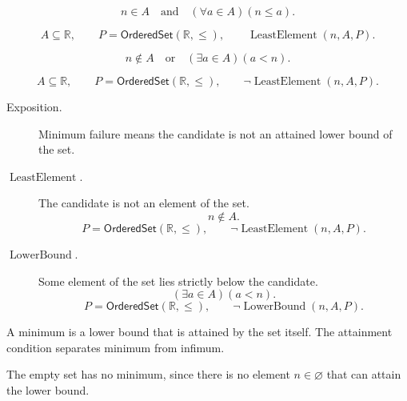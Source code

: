 \begin{remark*}
\[
  n\in A
  \quad\text{and}\quad
  (\forall a\in A)(n\leq a).
\]
\end{remark*}

\begin{remark*}
\[
  A\subseteq\mathbb{R},\qquad P=\mathsf{OrderedSet}(\mathbb{R},\leq),\qquad
  \operatorname{LeastElement}(n,A,P).
\]
\end{remark*}

\begin{remark*}
\[
  n\notin A
  \quad\text{or}\quad
  (\exists a\in A)(a<n).
\]
\end{remark*}

\begin{remark*}
\[
  A\subseteq\mathbb{R},\qquad P=\mathsf{OrderedSet}(\mathbb{R},\leq),\qquad
  \neg\operatorname{LeastElement}(n,A,P).
\]
\end{remark*}

\begin{remark*}
\begin{description}
  \item[Exposition.]
  Minimum failure means the candidate is not an attained lower bound of
  the set.

  \item[\(\operatorname{LeastElement}.\)]
  The candidate is not an element of the set.
  \[
    n\notin A.
  \]
  \[
    P=\mathsf{OrderedSet}(\mathbb{R},\leq),\qquad
    \neg\operatorname{LeastElement}(n,A,P).
  \]

  \item[\(\operatorname{LowerBound}.\)]
  Some element of the set lies strictly below the candidate.
  \[
    (\exists a\in A)(a<n).
  \]
  \[
    P=\mathsf{OrderedSet}(\mathbb{R},\leq),\qquad
    \neg\operatorname{LowerBound}(n,A,P).
  \]
\end{description}
\end{remark*}

\begin{remark*}[Interpretation]
A minimum is a lower bound that is attained by the set itself.  The
attainment condition separates minimum from infimum.
\end{remark*}

\begin{remark*}[Exposition]
The empty set has no minimum, since there is no element $n\in\varnothing$
that can attain the lower bound.
\end{remark*}

